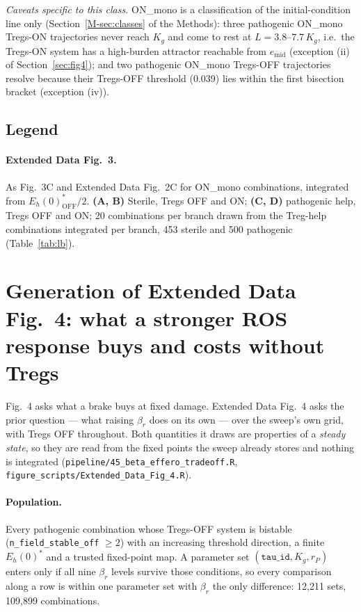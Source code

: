 \documentclass[11pt]{article}
\begin{document}
\emph{Caveats specific to this class.} ON\_mono is a classification of the
initial-condition line only (Section~\ref{M-sec:classes} of the Methods): three pathogenic ON\_mono
Tregs-ON trajectories never reach $K_g$ and come to rest at $L = 3.8$--$7.7\,K_g$, i.e.\
the Tregs-ON system has a high-burden attractor reachable from $e_{\mathrm{mid}}$
(exception (ii) of Section~\ref{sec:fig4}); and two pathogenic ON\_mono Tregs-OFF
trajectories resolve because their Tregs-OFF threshold (0.039) lies within the first
bisection bracket (exception (iv)).

\subsection{Legend}

\paragraph{Extended Data Fig.~3.}
As Fig.~3C and Extended Data Fig.~2C for ON\_mono combinations, integrated from $E_h(0)^*_{\mathrm{OFF}}/2$.
\textbf{(A, B)} Sterile, Tregs OFF and ON; \textbf{(C, D)} pathogenic help, Tregs OFF and
ON; 20 combinations per branch drawn from the Treg-help combinations integrated per branch,
453 sterile and 500 pathogenic (Table~\ref{tab:lb}).

\section{Generation of Extended Data Fig.~4: what a stronger ROS response buys and costs without Tregs}
\label{sec:figS03}

Fig.~4 asks what a brake buys at fixed damage. Extended Data Fig.~4 asks the prior
question --- what raising $\beta_r$ does on its own --- over the sweep's own grid, with Tregs
OFF throughout. Both quantities it draws are properties of a \emph{steady state}, so they are
read from the fixed points the sweep already stores and nothing is integrated
(\texttt{pipeline/45\_beta\_effero\_tradeoff.R}, \texttt{figure\_scripts/Extended\_Data\_Fig\_4.R}).

\paragraph{Population.} Every pathogenic combination whose Tregs-OFF system is bistable
(\texttt{n\_field\_stable\_off} $\ge 2$) with an increasing threshold direction, a finite
$E_h(0)^{*}$ and a trusted fixed-point map. A parameter set $(\texttt{tau\_id}, K_g, r_P)$
enters only if all nine $\beta_r$ levels survive those conditions, so every comparison along a
row is within one parameter set with $\beta_r$ the only difference: 12{,}211 sets, 109{,}899
combinations.
\end{document}
